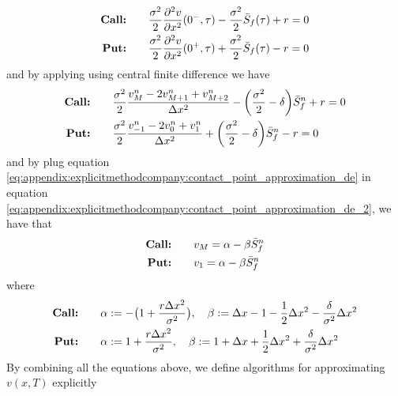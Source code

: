 \begin{align}
    \label{eq:appendix:explicitmethodcompany:contact_point_approximation_de}
    \text{\textbf{Call:}} \qquad & \dfrac{\sigma^2}{2}\dfrac{\partial^2{v}}{\partial{x^2}}(0^-, \tau) - \dfrac{\sigma^2}{2}\bar{S}_f(\tau) + r = 0 \\
    \text{\textbf{Put:}} \qquad & \dfrac{\sigma^2}{2}\dfrac{\partial^2{v}}{\partial{x^2}}(0^+, \tau) + \dfrac{\sigma^2}{2}\bar{S}_f(\tau) - r = 0
\end{align}
and by applying using central finite difference we have
\begin{align}
    \label{eq:appendix:explicitmethodcompany:contact_point_approximation_de_2}
    \text{\textbf{Call:}} \qquad & \dfrac{\sigma^2}{2}\dfrac{v^{n}_{M} - 2v^{n}_{M+1} + v^{n}_{M+2}}{\Delta{x}^2} - \bigg(\dfrac{\sigma^2}{2}-\delta\bigg)\bar{S}^n_f + r = 0 \\
    \text{\textbf{Put:}} \qquad & \dfrac{\sigma^2}{2}\dfrac{v^{n}_{-1} - 2v^{n}_{0} + v^{n}_{1}}{\Delta{x}^2} + \bigg(\dfrac{\sigma^2}{2}-\delta\bigg)\bar{S}^n_f -r = 0
\end{align}
and by plug equation \eqref{eq:appendix:explicitmethodcompany:contact_point_approximation_de} in equation \eqref{eq:appendix:explicitmethodcompany:contact_point_approximation_de_2}, we have that 
\begin{align}
    \text{\textbf{Call:}} \qquad & v_{M} = \alpha - \beta\bar{S}^n_f \\
    \text{\textbf{Put:}} \qquad & v_{1} = \alpha - \beta\bar{S}^n_f \\
\end{align}
where
\begin{align}
    \label{eq:appendix:explicitmethodcompany:alpha_beta}
    \text{\textbf{Call:}} \qquad & \alpha := -\big(1 + \dfrac{r\Delta{x}^2}{\sigma^2}\big), \quad \beta := \Delta{x}-1-\dfrac{1}{2}\Delta{x}^2-\dfrac{\delta}{\sigma^2}\Delta{x}^2\\
    \text{\textbf{Put:}} \qquad & \alpha := 1 + \dfrac{r\Delta{x}^2}{\sigma^2}, \quad \beta := 1+\Delta{x}+\dfrac{1}{2}\Delta{x}^2+\dfrac{\delta}{\sigma^2}\Delta{x}^2
\end{align}
By combining all the equations above, we define algorithms for approximating $v(x,T)$ explicitly
